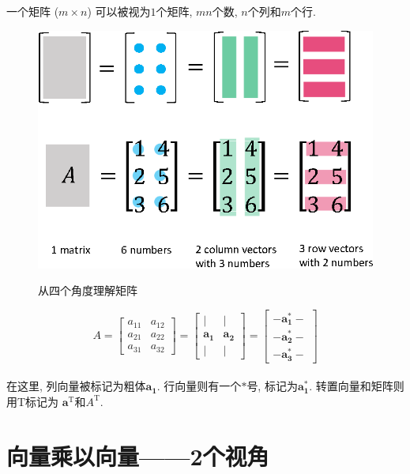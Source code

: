 \documentclass[letterpaper]{article}
\DeclareRobustCommand\transp{^{\mathrm{T}}}
\begin{document}
一个矩阵 ($m \times n$) 可以被视为$1$个矩阵, $mn$个数, $n$个列和$m$个行.

\begin{figure}[H]
  \centering
  \includegraphics[scale=0.8]{ViewingMatrix-4Ways.eps}\\
    \caption{从四个角度理解矩阵}
\end{figure}


\begin{equation*}
  A= \begin{bmatrix}
    a_{11} & a_{12}\\
    a_{21} & a_{22}\\
    a_{31} & a_{32}
  \end{bmatrix}
  =
  \begin{bmatrix}
    | & |\\
    \bm{a_1} & \bm{a_2}\\
    | & |
  \end{bmatrix}
  =
  \begin{bmatrix}
    - \bm{a_1^*} -\\
    - \bm{a_2^*} -\\
    - \bm{a_3^*} -
  \end{bmatrix}
\end{equation*} \\

在这里, 列向量被标记为粗体$\bm{a_1}$.
行向量则有一个$\bm{*}$号, 标记为$\bm{a_1^*}$.
转置向量和矩阵则用$\mathrm{T}$标记为
$\bm{a}\transp$和$A\transp$.

\section{向量乘以向量——2个视角}
\end{document}
